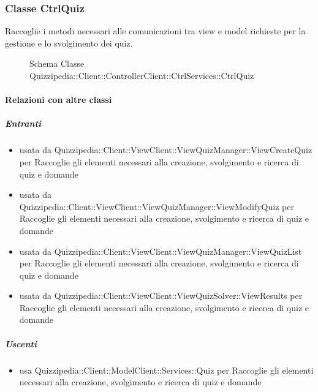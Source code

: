 \subsubsection{Classe CtrlQuiz}
Raccoglie i metodi necessari alle comunicazioni tra view e model richieste per la gestione e lo svolgimento dei quiz.
\begin{figure}[H]
\centering
\noindent{}
\caption[Schema Classe CtrlQuiz]{Schema Classe Quizzipedia::Client::ControllerClient::CtrlServices::CtrlQuiz}
\end{figure}
\paragraph{Relazioni con altre classi}
\subparagraph{Entranti}
\begin{itemize}
\item usata da Quizzipedia::Client::ViewClient::ViewQuizManager::ViewCreateQuiz per Raccoglie gli elementi necessari alla creazione, svolgimento e ricerca di quiz e domande
\item usata da Quizzipedia::Client::ViewClient::ViewQuizManager::ViewModifyQuiz per Raccoglie gli elementi necessari alla creazione, svolgimento e ricerca di quiz e domande
\item usata da Quizzipedia::Client::ViewClient::ViewQuizManager::ViewQuizList per Raccoglie gli elementi necessari alla creazione, svolgimento e ricerca di quiz e domande
\item usata da Quizzipedia::Client::ViewClient::ViewQuizSolver::ViewResults per Raccoglie gli elementi necessari alla creazione, svolgimento e ricerca di quiz e domande
\end{itemize}
\subparagraph{Uscenti}
\begin{itemize}
\item usa Quizzipedia::Client::ModelClient::Services::Quiz per Raccoglie gli elementi necessari alla creazione, svolgimento e ricerca di quiz e domande
\end{itemize}
